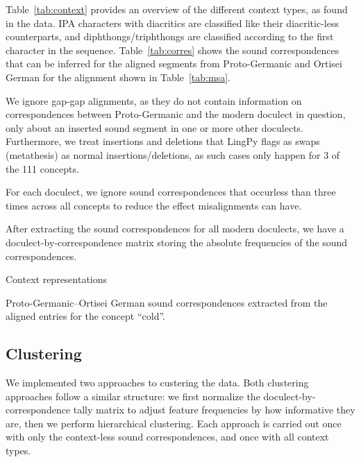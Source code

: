 \documentclass[a4paper]{article}
\begin{document}
Table~\ref{tab:context} provides an overview
of the different context types, as found in the data.
IPA characters with diacritics are classified
like their diacritic-less counterparts,
and diphthongs/triphthongs are classified
according to the first character in the sequence.
Table~\ref{tab:corres} shows the sound correspondences
that can be inferred for the aligned segments
from Proto-Germanic and Ortisei German for the alignment
shown in Table~\ref{tab:msa}.

We ignore gap-gap alignments,
as they do not contain information on correspondences
between Proto-Germanic and the modern doculect in question,
only about an inserted sound segment in one or more other doculects.
Furthermore, we treat insertions and deletions
that LingPy flags as swaps (metathesis) as normal insertions/deletions,
as such cases only happen for 3 of the 111 concepts.

For each doculect, we ignore sound correspondences
that occurless than three times across all concepts
to reduce the effect misalignments can have. 

After extracting the sound correspondences for
all modern doculects, we have a doculect-by-correspondence
matrix storing the absolute frequencies of the sound correspondences.

\begin{table}[]

\caption{Context representations}
\label{tab:context}
\end{table}

\begin{table}[h]

\caption{
Proto-Germanic--Ortisei German sound correspondences
extracted from the aligned entries for the concept ``cold''.}
\label{tab:corres}
\end{table}


\subsection{Clustering}
\label{subsec:clustering}

We implemented two approaches to custering the data.
Both clustering approaches follow a similar structure:
we first normalize the doculect-by-correspondence tally matrix
to adjust feature frequencies by how informative they are,
then we perform hierarchical clustering.
Each approach is carried out once with only
the context-less sound correspondences,
and once with all context types.
\end{document}
